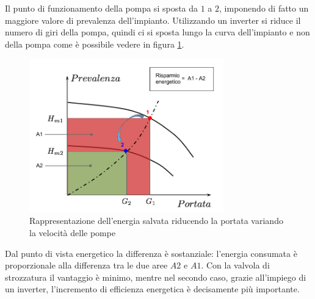 \documentclass[laurea,oneside,11pt]{USiena_tesiLM}
\begin{document}
Il punto di funzionamento della pompa si sposta da $1$ a $2$, imponendo di fatto un maggiore valore di prevalenza dell'impianto. Utilizzando un inverter si riduce il numero di giri della pompa, quindi ci si sposta lungo la curva dell'impianto e non della pompa come è possibile vedere in figura \ref{fig:var_velocita}. 

\begin{figure}[!ht]
\centering
\includegraphics[width=0.75\textwidth]{figure/var_velocita} 
\caption{Rappresentazione dell'energia salvata riducendo la portata variando la velocità delle pompe}
\label{fig:var_velocita}
\end{figure}

Dal punto di vista energetico la differenza è sostanziale: l'energia consumata è proporzionale alla differenza tra le due aree $A2$ e $A1$. Con la valvola di strozzatura il vantaggio è minimo, mentre nel secondo caso, grazie all'impiego di un inverter, l'incremento di efficienza energetica è decisamente più importante.
\end{document}

